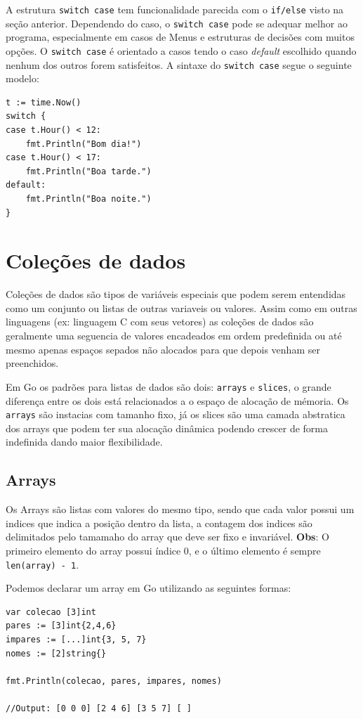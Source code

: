\documentclass{SBCbookchapter}
\begin{document}
A estrutura \texttt{switch case} tem funcionalidade parecida com o \texttt{if/else} visto na seção anterior. Dependendo do caso, o \texttt{switch case} pode se adequar melhor ao programa, especialmente em casos de Menus e estruturas de decisões com muitos opções. O \texttt{switch case} é orientado a casos tendo o caso \textit{default} escolhido quando nenhum dos outros forem satisfeitos. A sintaxe do \texttt{switch case} segue o seguinte modelo:

\begin{lstlisting}
t := time.Now()
switch {
case t.Hour() < 12:
	fmt.Println("Bom dia!")
case t.Hour() < 17:
	fmt.Println("Boa tarde.")
default:
	fmt.Println("Boa noite.")
}
\end{lstlisting}

\section{Coleções de dados}

Coleções de dados são tipos de variáveis especiais que podem serem entendidas como um conjunto ou listas de outras variaveis ou valores. Assim como em outras linguagens (ex: linguagem C com seus vetores) as coleções de dados são geralmente uma seguencia de valores encadeados em ordem predefinida ou até mesmo apenas espaços sepados não alocados para que depois venham ser preenchidos.


Em Go os padrões para listas de dados são dois: \texttt{arrays} e \texttt{slices}, o grande diferença entre os dois está relacionados a o espaço de alocação de mémoria. Os \texttt{arrays} são instacias com tamanho fixo, já os slices são uma camada abstratica dos arrays que podem ter sua alocação dinâmica podendo crescer de forma indefinida dando maior flexibilidade.

\subsection{Arrays}

Os Arrays são listas com valores do mesmo tipo, sendo que cada valor possui um indices que indica a posição dentro da lista, a contagem dos indices são delimitados pelo tamamaho do array que deve ser fixo e invariável. \textbf{Obs}: O primeiro elemento do array possui índice 0, e o último elemento é sempre \texttt{len(array) - 1}.


Podemos declarar um array em Go utilizando as seguintes formas:

\begin{lstlisting}
var colecao [3]int
pares := [3]int{2,4,6}
impares := [...]int{3, 5, 7}
nomes := [2]string{}

fmt.Println(colecao, pares, impares, nomes)

//Output: [0 0 0] [2 4 6] [3 5 7] [ ]
\end{lstlisting}
\end{document}
